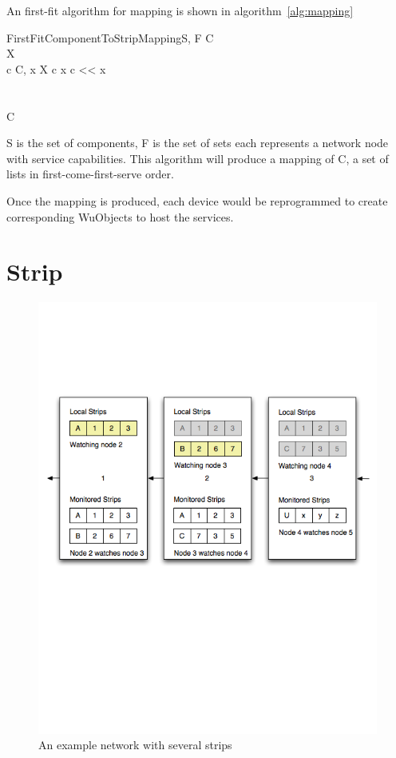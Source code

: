 An first-fit algorithm for mapping is shown in algorithm~\ref{alg:mapping}

\begin{pseudocode}[framebox]{FirstFitComponentToStripMapping}{S, F}
\label{alg:mapping}
C \\
X \\

\FOREACH c \in C, x \in X \DO
  \BEGIN
    \IF c \in x \THEN
      \BEGIN
        c << x\\
      \END\\
  \END\\

\RETURN C
\end{pseudocode}

S is the set of components, F is the set of
sets each represents a network node with service capabilities. This algorithm
will produce a mapping of C, a set of lists in first-come-first-serve order.

Once the mapping is produced, each device would be reprogrammed to create
corresponding WuObjects to host the services.

\section{Strip}
\label{s:ss}

\begin{figure}[h!]
\caption{An example network with several strips}
\label{fig:strip1}
\centering
    \includegraphics[width=\linewidth]{figures/strip1}
\end{figure}

